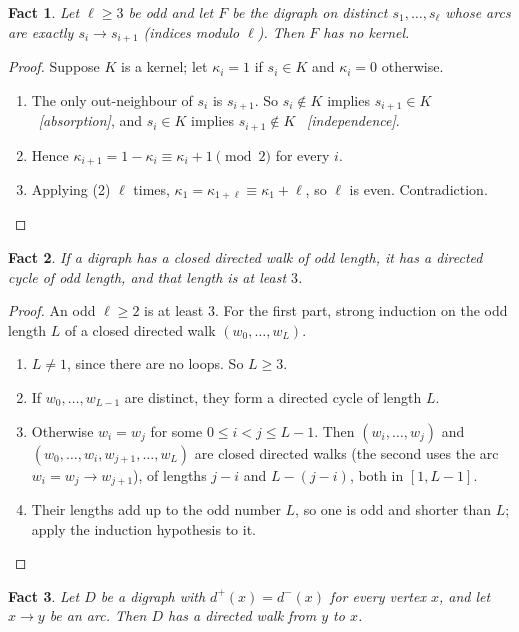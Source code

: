 \documentclass[11pt]{article}
\theoremstyle{plain}
\newtheorem{fact}{Fact}
\theoremstyle{definition}
\newcommand{\dout}{d^{+}}
\newcommand{\din}{d^{-}}
\newcommand{\why}[1]{\unskip\ \textit{[#1]}}
\newenvironment{steps}{\begin{enumerate}[label=(\arabic*),leftmargin=2.2em,itemsep=0.35em]}{\end{enumerate}}
\begin{document}
\begin{fact}\label{f:oddcycle}
Let $\ell\ge 3$ be odd and let $F$ be the digraph on distinct $s_1,\dots,s_\ell$ whose arcs are
exactly $s_i\to s_{i+1}$ (indices modulo $\ell$). Then $F$ has no kernel.
\end{fact}

\begin{proof}
Suppose $K$ is a kernel; let $\kappa_i=1$ if $s_i\in K$ and $\kappa_i=0$ otherwise.
\begin{steps}
  \item The only out-neighbour of $s_i$ is $s_{i+1}$. So $s_i\notin K$ implies $s_{i+1}\in K$
    \why{absorption}, and $s_i\in K$ implies $s_{i+1}\notin K$ \why{independence}.
  \item Hence $\kappa_{i+1}=1-\kappa_i\equiv\kappa_i+1\pmod 2$ for every $i$.
  \item Applying (2) $\ell$ times, $\kappa_1=\kappa_{1+\ell}\equiv\kappa_1+\ell$, so $\ell$ is
    even. Contradiction. \qedhere
\end{steps}
\end{proof}

\begin{fact}\label{f:oddwalk}
If a digraph has a closed directed walk of odd length, it has a directed cycle of odd length,
and that length is at least $3$.
\end{fact}

\begin{proof}
An odd $\ell\ge 2$ is at least $3$. For the first part, strong induction on the odd length $L$
of a closed directed walk $(w_0,\dots,w_L)$.
\begin{steps}
  \item $L\ne 1$, since there are no loops. So $L\ge 3$.
  \item If $w_0,\dots,w_{L-1}$ are distinct, they form a directed cycle of length $L$.
  \item Otherwise $w_i=w_j$ for some $0\le i<j\le L-1$. Then $(w_i,\dots,w_j)$ and
    $(w_0,\dots,w_i,w_{j+1},\dots,w_L)$ are closed directed walks (the second uses the arc
    $w_i=w_j\to w_{j+1}$), of lengths $j-i$ and $L-(j-i)$, both in $[1,L-1]$.
  \item Their lengths add up to the odd number $L$, so one is odd and shorter than $L$; apply the
    induction hypothesis to it. \qedhere
\end{steps}
\end{proof}

\begin{fact}\label{f:balanced}
Let $D$ be a digraph with $\dout(x)=\din(x)$ for every vertex $x$, and let $x\to y$ be an arc.
Then $D$ has a directed walk from $y$ to $x$.
\end{fact}
\end{document}
